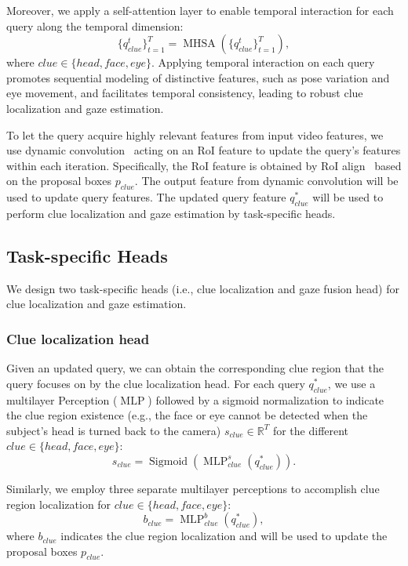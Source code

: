 \documentclass[journal]{IEEEtran}
\begin{document}
Moreover, we apply a self-attention layer to enable temporal interaction for each query along the temporal dimension:
\begin{equation}
\{q_{clue}^{t}\}_{t=1}^{T} = \operatorname{MHSA}(\{q_{clue}^{t}\}_{t=1}^{T}),
\end{equation}
where $clue \in \{ head, face, eye \}$. Applying temporal interaction on each query promotes sequential modeling of distinctive features, such as pose variation and eye movement, and facilitates temporal consistency, leading to robust clue localization and gaze estimation.


To let the query acquire highly relevant features from input video features, we use dynamic convolution~\cite{sparse} acting on an RoI feature to update the query's features within each iteration. Specifically, the RoI feature is obtained by RoI align~\cite{maskrcnn} based on the proposal boxes $p_{clue}$. The output feature from dynamic convolution will be used to update query features. The updated query feature $q_{clue}^{*}$ will be used to perform clue localization and gaze estimation by task-specific heads.

\subsection{Task-specific Heads}
We design two task-specific heads (i.e., clue localization and gaze fusion head) for clue localization and gaze estimation.



\subsubsection{\textbf{Clue localization head}}

Given an updated query, we can obtain the corresponding clue region that the query focuses on by the clue localization head. For each query $q^{*}_{clue}$, we use a multilayer Perception ($\operatorname{MLP}$) followed by a sigmoid normalization to indicate the clue region existence (e.g., the face or eye cannot be detected when the subject's head is turned back to the camera) $s_{clue}\in \mathbb{R}^{T}$ for the different $clue \in \{head, face, eye\}$:
\begin{equation}
    s_{clue}= \operatorname{Sigmoid}(\operatorname{MLP}^{s}_{clue}(q^{*}_{clue})).
\end{equation}

Similarly, we employ three separate multilayer perceptions to accomplish clue region localization for $clue \in \{head, face, eye\}$:
\begin{equation}
    b_{clue}= \operatorname{MLP}^{b}_{clue}(q^{*}_{clue}),
\end{equation}
where $b_{clue}$ indicates the clue region localization and will be used to update the proposal boxes $p_{clue}$.
\end{document}
